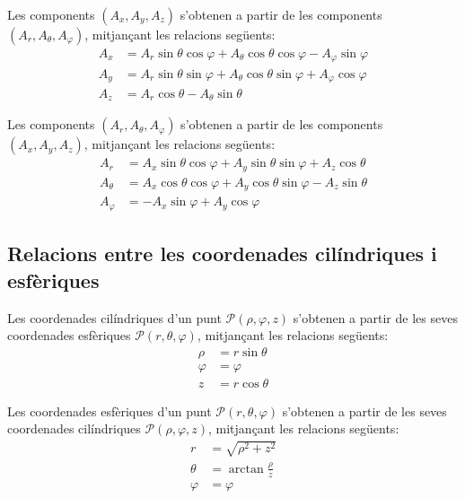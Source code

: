 \documentclass[catalan,a4paper,twoside,11pt]{article}
\begin{document}
Les components  $(A_x, A_y, A_z)$ s'obtenen a partir de les  components  $(A_r, A_\theta, A_\varphi)$, mitjançant les relacions següents:
\begin{subequations}\begin{align}
    A_x &= A_r\sin\theta\cos\varphi+A_\theta\cos\theta\cos\varphi-A_\varphi\sin\varphi \\
    A_y &= A_r\sin\theta\sin\varphi+A_\theta\cos\theta\sin\varphi+A_\varphi\cos\varphi\\
    A_z &= A_r\cos\theta-A_\theta\sin\theta
\end{align}\end{subequations}

Les components  $(A_r, A_\theta, A_\varphi)$ s'obtenen a partir de les  components  $(A_x, A_y, A_z)$, mitjançant les relacions següents:
\begin{subequations}\begin{align}
    A_r &=  A_x\sin\theta\cos\varphi+A_y\sin\theta\sin\varphi+A_z\cos\theta\\
    A_\theta &=  A_x\cos\theta\cos\varphi+A_y\cos\theta\sin\varphi-A_z\sin\theta\\
    A_\varphi &= -A_x\sin\varphi+A_y\cos\varphi
\end{align}\end{subequations}


\subsection{Relacions entre les coordenades cilíndriques i
esfèriques}

Les coordenades cilíndriques  d'un punt $\mathscr{P}(\rho,\varphi,z)$
s'obtenen a partir de les seves coordenades esfèriques
$\mathscr{P}(r,\theta,\varphi)$, mitjançant les relacions següents:
\begin{subequations}\begin{align}
    \rho &=r\sin\theta \\ \varphi &=\varphi \\z &=r\cos\theta
\end{align}\end{subequations}

Les coordenades  esfèriques  d'un punt $\mathscr{P}(r,\theta,\varphi)$
s'obtenen a partir de les seves coordenades cilíndriques
$\mathscr{P}(\rho,\varphi,z)$, mitjançant les relacions següents:
\begin{subequations}\begin{align}
    r &=\sqrt{\rho^2+z^2}\\
    \theta &=\arctan\frac{\rho}{z}\\
    \varphi &=\varphi
\end{align}\end{subequations}
\end{document}
